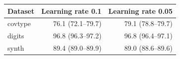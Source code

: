 \begin{tabular}{lrr}
\toprule
Dataset & Learning rate 0.1 & Learning rate 0.05 \\
\midrule
covtype & 76.1 (72.1--79.7) & 79.1 (78.8--79.7) \\
digits & 96.8 (96.3--97.2) & 96.8 (96.4--97.1) \\
synth & 89.4 (89.0--89.9) & 89.0 (88.6--89.6) \\
\bottomrule
\end{tabular}
